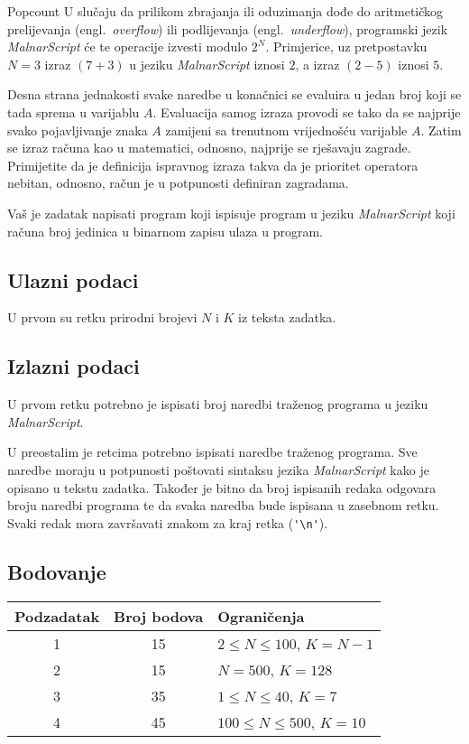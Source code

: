 \begin{statement}[
  problempoints=110,
  timelimit=1 sekunda,
  memorylimit=512 MiB,
]{Popcount}
U slučaju da prilikom zbrajanja ili oduzimanja dođe do aritmetičkog
prelijevanja (engl.\ \textit{overflow}) ili podlijevanja (engl.\
\textit{underflow}), programski jezik \textit{MalnarScript} će te operacije
izvesti modulo $2^N$. Primjerice, uz pretpostavku $N=3$ izraz $(7+3)$ u jeziku
\textit{MalnarScript} iznosi $2$, a izraz $(2-5)$ iznosi $5$.

Desna strana jednakosti svake naredbe u konačnici se evaluira u jedan broj koji
se tada sprema u varijablu $A$. Evaluacija samog izraza provodi se tako da se
najprije svako pojavljivanje znaka $A$ zamijeni sa trenutnom vrijednošću
varijable $A$. Zatim se izraz računa kao u matematici, odnosno, najprije se
rješavaju zagrade. Primijetite da je definicija ispravnog izraza takva da je
prioritet operatora nebitan, odnosno, račun je u potpunosti definiran
zagradama.

Vaš je zadatak napisati program koji ispisuje program u jeziku
\textit{MalnarScript} koji računa broj jedinica u binarnom zapisu ulaza u
program.

\subsection*{Ulazni podaci}
U prvom su retku prirodni brojevi $N$ i $K$ iz teksta zadatka.

\subsection*{Izlazni podaci}
U prvom retku potrebno je ispisati broj naredbi traženog programa u jeziku
\textit{MalnarScript}.

U preostalim je retcima potrebno ispisati naredbe traženog programa. Sve
naredbe moraju u potpunosti poštovati sintaksu jezika \textit{MalnarScript}
kako je opisano u tekstu zadatka. Također je bitno da broj ispisanih redaka
odgovara broju naredbi programa te da svaka naredba bude ispisana u zasebnom
retku. Svaki redak mora završavati znakom za kraj retka (\verb|'\n'|).

\subsection*{Bodovanje}
{\renewcommand{\arraystretch}{1.4}
  \setlength{\tabcolsep}{6pt}
  \begin{tabular}{ccl}
 Podzadatak & Broj bodova & Ograničenja \\ \midrule
  1 & 15 & $2 \le N \le 100$, $K = N - 1$ \\
  2 & 15 & $N = 500$, $K = 128$ \\
  3 & 35 & $1 \le N \le 40$, $K=7$ \\
  4 & 45 & $100 \le N \le 500$, $K=10$
\end{tabular}}


\end{statement}
